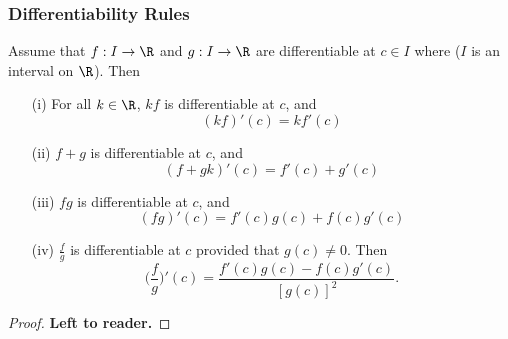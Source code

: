 \subsubsection{Differentiability Rules}\label{Differentiability Rules}

\begin{theorem}
    Assume that \( f: I \to \R  \) and \( g : I \to \R  \) are differentiable at \( c \in I  \) where (\( I  \) is an interval on \( \R  \)). Then
    \begin{enumerate}
        \item[(i)] For all \( k \in \R  \), \( kf  \) is differentiable at \( c  \), and
            \[  (kf)'(c) = k f'(c) \]
        \item[(ii)] \( f+ g  \) is differentiable at \( c  \), and 
            \[  (f+gk)'(c) = f'(c) + g'(c) \]
        \item[(iii)] \( fg  \) is differentiable at \( c  \), and 
            \[  (fg)'(c) = f'(c) g(c) + f(c) g'(c) \]
        \item[(iv)] \( \frac{ f }{ g }  \) is differentiable at \( c  \) provided that \( g(c) \neq 0  \). Then
            \[  \Big(  \frac{ f }{ g }  \Big)' (c) = \frac{ f'(c) g(c) - f(c) g'(c) }{ [g(c)]^{2} }. \]
    \end{enumerate} 
\end{theorem}

\begin{proof}
\textbf{Left to reader.}
\end{proof}


